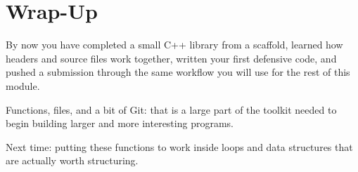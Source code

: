 \documentclass{csc2059practical}
\begin{document}
\section{Wrap-Up}

\begin{wrapupbox}
By now you have completed a small C++ library from a scaffold, learned how headers and source files work together, written your first defensive code, and pushed a submission through the same workflow you will use for the rest of this module.

Functions, files, and a bit of Git: that is a large part of the toolkit needed to begin building larger and more interesting programs.

Next time: putting these functions to work inside loops and data structures that are actually worth structuring.
\end{wrapupbox}
\end{document}
